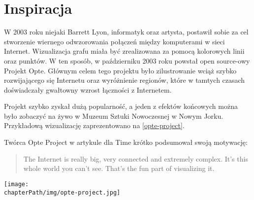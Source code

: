 \section{Inspiracja}
W 2003 roku niejaki Barrett Lyon, informatyk oraz artysta, postawił sobie za cel stworzenie wiernego odwzorowania połączeń między komputerami w sieci Internet. Wizualizacja grafu miała być zrealizowana za pomocą kolorowych linii oraz punktów. W ten sposób, w październiku 2003 roku powstał open source-owy Projekt Opte. Głównym celem tego projektu było zilustrowanie wciąż szybko rozwijającego się Internetu oraz wyróżnienie regionów, które w tamtych czasach doświadczały gwałtowny wzrost łączności z Internetem.

Projekt szybko zyskał dużą popularność, a jeden z efektów końcowych można było zobaczyć na żywo w Muzeum Sztuki Nowoczesnej w Nowym Jorku. Przykładową wizualizację zaprezentowano na \ref{opte-project}.

Twórca Opte Project w artykule dla Time \cite{OpteProject:Time} krótko podsumował swoją motywację:

\begin{center}

\hyphenblockcquote{USenglish}{OpteProject:Time}{
	The Internet is really big, very connected and extremely complex. \linebreak
	It’s this whole world you can’t see. That’s the fun part of visualizing it.
}
\end{center}


\begin{figure*}[!h]
	\begin{center}
		\texttt{[image: \\chapterPath/img/opte-project.jpg]}
		\caption{Jedna z wizualizacji stworzona przez Opte Project}
		\label{opte-project}
	\end{center}
\end{figure*}
